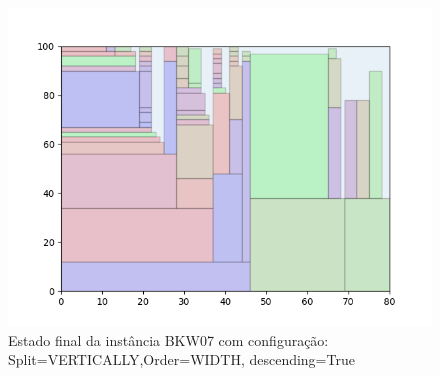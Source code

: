 \begin{figure}[H]
    \centering
    \caption[]{Estado final da instância BKW07 com configuração: Split=VERTICALLY,Order=WIDTH, descending=True}
    \label{fig:bkw07-vertically-width-true}
    \includegraphics[scale=0.5]{output/figures/bkw/bkw07/vertically/width/true/00}
\end{figure}